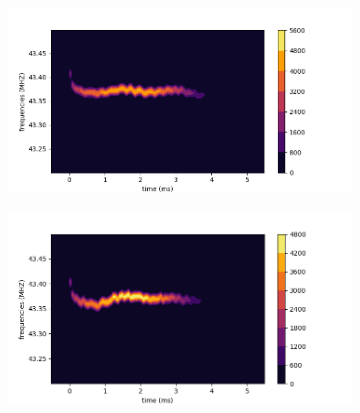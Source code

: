 \documentclass[10pt]{report}
\begin{document}
\begin{figure}[h!]
\centering
\begin{subfigure}{.48\textwidth}
  \centering
  \includegraphics[width=1.1\linewidth]{spec3-42}
\end{subfigure}%
\hspace{1em}%
\begin{subfigure}{.48\textwidth}
  \centering
  \includegraphics[width=1.1\linewidth]{spec3-43}
\end{subfigure}
\end{figure}
\end{document}
